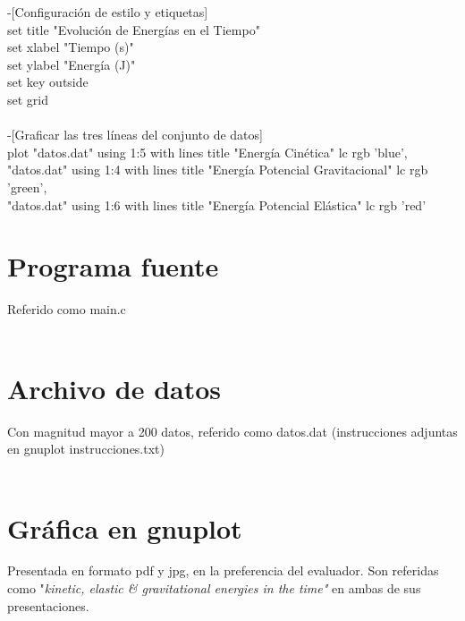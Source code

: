 \documentclass{article}
\begin{document}
-[Configuración de estilo y etiquetas]\\
set title "Evolución de Energías en el Tiempo"\\
set xlabel "Tiempo (s)"\\
set ylabel "Energía (J)"\\
set key outside\\
set grid\\
\\
-[Graficar las tres líneas del conjunto de datos]\\
plot "datos.dat" using 1:5 with lines title "Energía Cinética" lc rgb 'blue', \\
     "datos.dat" using 1:4 with lines title "Energía Potencial Gravitacional" lc rgb 'green', \\
     "datos.dat" using 1:6 with lines title "Energía Potencial Elástica" lc rgb 'red'\\
\newpage
\section{Programa fuente}
Referido como main.c\\\\

\section{Archivo de datos}
Con magnitud mayor a 200 datos, referido como datos.dat (instrucciones adjuntas en gnuplot instrucciones.txt)\\\\

\section{Gráfica en gnuplot}
Presentada en formato pdf y jpg, en la preferencia del evaluador. Son referidas como "\textit{kinetic, elastic & gravitational energies in the time"} en ambas de sus presentaciones.
\end{document}
